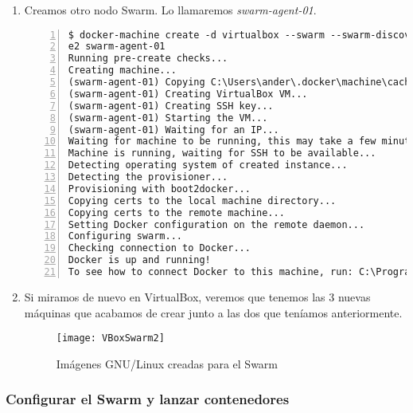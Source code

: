 \begin{enumerate}
				\item Creamos otro nodo Swarm. Lo llamaremos \textit{swarm-agent-01}.
				\begin{lstlisting}[style=consola,numbers=left]
$ docker-machine create -d virtualbox --swarm --swarm-discovery token://dc60acd12fc3a6b14754abef91501b
e2 swarm-agent-01
Running pre-create checks...
Creating machine...
(swarm-agent-01) Copying C:\Users\ander\.docker\machine\cache\boot2docker.iso to C:\Users\ander\.docker\machine\machines\swarm-agent-01\boot2docker.iso...
(swarm-agent-01) Creating VirtualBox VM...
(swarm-agent-01) Creating SSH key...
(swarm-agent-01) Starting the VM...
(swarm-agent-01) Waiting for an IP...
Waiting for machine to be running, this may take a few minutes...
Machine is running, waiting for SSH to be available...
Detecting operating system of created instance...
Detecting the provisioner...
Provisioning with boot2docker...
Copying certs to the local machine directory...
Copying certs to the remote machine...
Setting Docker configuration on the remote daemon...
Configuring swarm...
Checking connection to Docker...
Docker is up and running!
To see how to connect Docker to this machine, run: C:\Program Files\Docker Toolbox\docker-machine.exe env swarm-agent-01
				\end{lstlisting}
	
				\item Si miramos de nuevo en VirtualBox, veremos que tenemos las 3 nuevas máquinas que acabamos de crear junto a las dos que teníamos anteriormente.
				
				\begin{figure}[H] %
					\centering
					\texttt{[image: VBoxSwarm2]}
					\caption{Imágenes GNU/Linux creadas para el Swarm}
					\label{fig:VBoxSwarm2}
				\end{figure}
				
			\end{enumerate}
			
			\subsubsection{Configurar el Swarm y lanzar contenedores}
			

